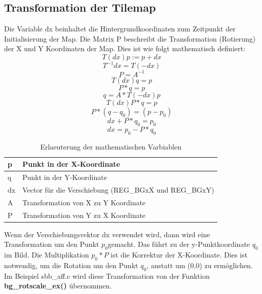 \subsection{Transformation der Tilemap}
Die Variable dx beinhaltet die Hintergrundkoordinaten zum Zeitpunkt der Initialisierung der Map.
Die Matrix P beschreibt die Transformation (Rotierung) der X und Y Koordinaten der Map. Dies ist wie folgt mathematisch definiert:
\begin{equation}
T(dx)p := p + dx
\end{equation}
\begin{equation}
T^{-1}dx = T(-dx)
\end{equation}
\begin{equation}
P = A^{-1}
\end{equation}
\begin{equation}
T(dx)q = p
\end{equation}
\begin{equation}
P * q = p
\end{equation}
\begin{equation}
q = A * T(-dx)p
\end{equation}
\begin{equation}
T(dx)P * q = p
\end{equation}
\begin{equation}
P * (q-q_{0}) = (p-p_{0})
\end{equation}
\begin{equation}
dx + P * q_{0} = p_{0}
\end{equation}
\begin{equation}
dx = p_{0} - P * q_{0}
\end{equation}
\begin{table}[h]
\centering
\begin{tabular}{|l|l|}
\hline
p  & Punkt in der X-Koordinate                             \\ \hline
q  & Punkt in der Y-Koordinate                             \\ \hline
dx & Vector für die Verschiebung (REG\_BGxX und REG\_BGxY) \\ \hline
A  & Transformation von X zu Y Koordinate                  \\ \hline
P  & Transformation von Y zu X Koordinate                  \\ \hline
\end{tabular}
\caption{Erlaeuterung der mathematischen Varbiablen}
\label{mathavar}
\end{table}
\newpage
Wenn der Verschiebungsvektor dx verwendet wird, dann wird eine Transformation um den Punkt $p_{0}$gemacht. Das führt zu der y-Punktkoordinate $q_{0}$im Bild. Die Multiplikation $p_{0}* P$ ist die Korrektur der X-Koordinate. Dies ist notwendig, um die Rotation um den Punkt $q_{0}$, anstatt um (0,0) zu ermöglichen. Im Beispiel sbb\_aff.c wird diese Transformation von der Funktion \textbf{bg\_rotscale\_ex()} übernommen.
